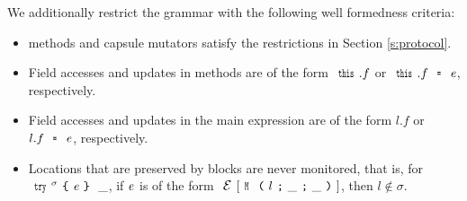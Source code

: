 We additionally restrict the grammar with the following well formedness criteria:
\begin{itemize}
	\item \Q@invariant@ methods and capsule mutators satisfy the restrictions in Section \ref{s:protocol}.
	\item Field accesses and updates in methods are of the form $\Kw{this}.f$ or $\Kw{this}.f\equals\e$, respectively.
	\item Field accesses and updates in the main expression are of the form $l.f$ or $l.f\equals\e$, respectively.
	\item Locations that are preserved by \Q@try@ blocks are
	never monitored, that is, for $\Kw{try}^\sigma\oC\e\cC\ \_$, if ${\mathit{e}}$ is of the form $\ctx[\M{l}{\_}{\_}]$, then $l\notin\sigma$.
\end{itemize}
\newcommand{\rowSpace}{\\\vspace{2.5ex}}
